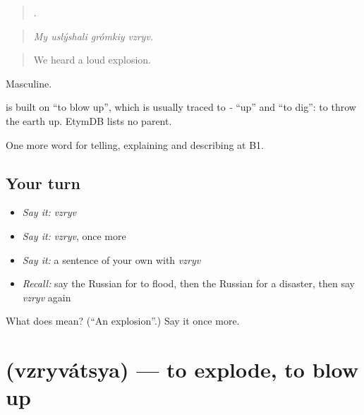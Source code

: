 \begin{quote}
   .
\end{quote}

\begin{quote}
\emph{My uslýshali grómkiy vzryv.}
\end{quote}

\begin{quote}
We heard a loud explosion.
\end{quote}

Masculine.

\begin{cousinweb}
\emph{} is built on \emph{} \textquotedblleft{}to blow up\textquotedblright{}, which is usually traced to \emph{-} \textquotedblleft{}up\textquotedblright{} and \emph{} \textquotedblleft{}to dig\textquotedblright{}: to throw the earth up. EtymDB lists no parent.
\end{cousinweb}

\begin{grammarlens}[title={What you've built}]
One more word for telling, explaining and describing at B1.
\end{grammarlens}

\subsection*{Your turn}
\begin{itemize}
\raggedright
  \item \emph{Say it:} \emph{vzryv}
  \item \emph{Say it:} \emph{vzryv}, once more
  \item \emph{Say it:} a sentence of your own with \emph{vzryv}
  \item \emph{Recall:} say the Russian for to flood, then the Russian for a disaster, then say \emph{vzryv} again
\end{itemize}

\begin{tcolorbox}[breakable,colback=teal!4,colframe=teal!35!black,title={Before you move on}]
What does  mean? (\textquotedblleft{}An explosion\textquotedblright{}.) Say it once more.
\end{tcolorbox}
\section[\texorpdfstring{\ru{взрываться} (vzryvátsya)}{взрываться (vzryvátsya)}]{ (vzryvátsya) — to explode, to blow up}

